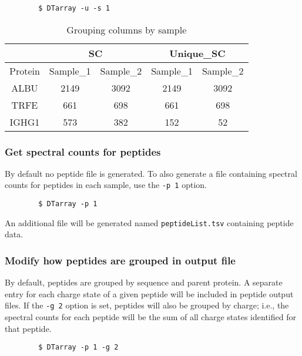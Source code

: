 \documentclass[12pt]{article}
\begin{document}
	\begin{lstlisting}
		$ DTarray -u -s 1
	\end{lstlisting}
	
	\begin{table}[h!]
		\centering
		\footnotesize
		\begin{tabular}{ccccc}
			\toprule
			& \multicolumn{2}{c}{SC}
			& \multicolumn{2}{c}{Unique\_SC} \\
			\midrule
			Protein & Sample\_1 & Sample\_2 & Sample\_1 & Sample\_2 \\ 
			\midrule
			ALBU & 2149 & 3092 & 2149 & 3092 \\
			TRFE & 661 & 698 & 661 & 698 \\ 
			IGHG1 & 573 & 382 & 152 & 52 \\ 
			\toprule
		\end{tabular}
		\caption{Grouping columns by sample}
		\label{table:s_1}
	\end{table}
	
	\subsubsection{Get spectral counts for peptides}
	
	\noindent
	By default no peptide file is generated.  To also generate a file containing spectral counts for peptides in each sample, use the \texttt{-p 1} option.
	
	\begin{lstlisting}
		$ DTarray -p 1
	\end{lstlisting}
	
	\noindent
	An additional file will be generated named \texttt{peptideList.tsv} containing peptide data.
	
	\subsubsection{Modify how peptides are grouped in output file}
	
	\noindent
	By default, peptides are grouped by sequence and parent protein.  A separate entry for each	charge state of a given peptide will be  included  in  peptide	output files.  If the \texttt{-g 2} option is set, peptides will also be grouped by charge; i.e., the spectral counts for each peptide will be the sum of all charge states identified for that peptide.
	
	\begin{lstlisting}
		$ DTarray -p 1 -g 2
	\end{lstlisting}
	
\end{document}
